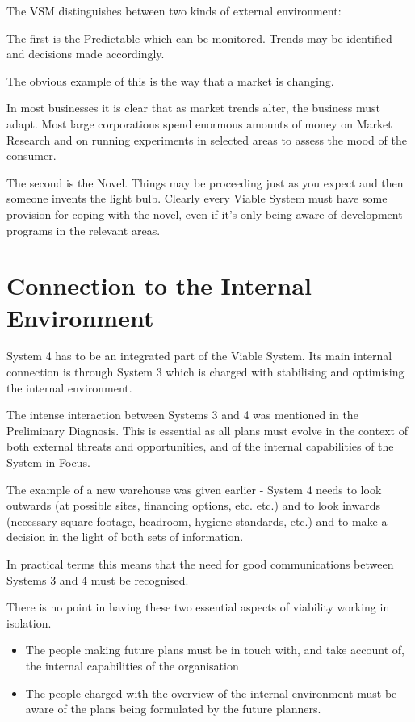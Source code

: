 The VSM distinguishes between two kinds of external environment:

The first is the Predictable which can be monitored. Trends may be identified and decisions made accordingly.

The obvious example of this is the way that a market is changing.

In most businesses it is clear that as market trends alter, the business must adapt. Most large corporations spend enormous amounts of money on Market Research and on running experiments in selected areas to assess the mood of the consumer.

The second is the Novel. Things may be proceeding just as you expect and then someone invents the light bulb. Clearly every Viable System must have some provision for coping with the novel, even if it's only being aware of development programs in the relevant areas.

\section*{Connection to the Internal Environment}
System 4 has to be an integrated part of the Viable System. Its main internal connection is through System 3 which is charged with stabilising and optimising the internal environment.

The intense interaction between Systems 3 and 4 was mentioned in the Preliminary Diagnosis. This is essential as all plans must evolve in the context of both external threats and opportunities, and of the internal capabilities of the System-in-Focus.

The example of a new warehouse was given earlier - System 4 needs to look outwards (at possible sites, financing options, etc. etc.) and to look inwards (necessary square footage, headroom, hygiene standards, etc.) and to make a decision in the light of both sets of information.

In practical terms this means that the need for good communications between Systems 3 and 4 must be recognised.

There is no point in having these two essential aspects of viability working in isolation.

\begin{itemize}
  \item The people making future plans must be in touch with, and take account of, the internal capabilities of the organisation

  \item The people charged with the overview of the internal environment must be aware of the plans being formulated by the future planners.

\end{itemize}

